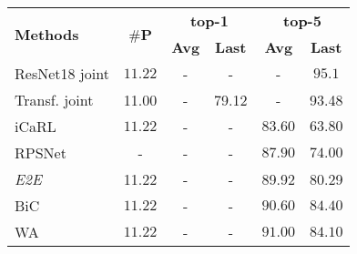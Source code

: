 \begin{table}[t]
    \centering
    \begin{tabular}{l|ccccc}
        \hline
        \multirow{2}{*}{\textbf{Methods}}                                & \multirow{2}{*}{\textbf{$\#$P}} & \multicolumn{2}{c}{\textbf{top-1}} & \multicolumn{2}{c}{\textbf{top-5}}                                \\
                                                                         &                                 & \textbf{Avg}                       & \textbf{Last}                      & \textbf{Avg} & \textbf{Last} \\
        \hline
        ResNet18 joint                                                   & $11.22$                         & -                                  & -                                  & -            & $95.1$        \\
        Transf. joint                                                    & 11.00                           & -                                  & 79.12                              & -            & 93.48         \\
        \hline
        iCaRL \scriptsize{\citep{rebuffi2017icarl}}                      & $11.22$                         & -                                  & -                                  & $83.60$      & $63.80$       \\
        RPSNet \scriptsize{\citep{rajasegaran2019rpsnet}}                & -                               & -                                  & -                                  & $87.90$      & $74.00$       \\
        \textit{E2E} \scriptsize{\citep{castro2018end_to_end_inc_learn}} & 11.22
                                                                         & -                               & -                                  & 89.92                              &
        80.29                                                                                                                                                                                                       \\
        BiC \scriptsize{\citep{wu2019bias_correction}}                   & $11.22$                         & -                                  & -                                  & $90.60$      & $84.40$       \\
        WA \scriptsize{\citep{zhao2020weightalignement}}                 & $11.22$                         & -                                  & -                                  & $91.00$      & $84.10$       \\

\end{tabular}
\end{table}
